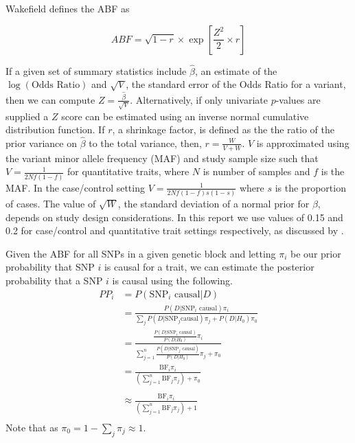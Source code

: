 \documentclass[a4paper,11pt]{report}
\begin{document}
Wakefield defines the ABF as

\begin{equation}
	ABF =  \sqrt{1 - r} \times \exp{\left[\frac{Z^{2}}{2} \times r\right]}
\end{equation}

If a given set of summary statistics include $\hat{\beta}$, an  estimate of the $\log(\text{Odds Ratio})$ and $\sqrt{V}$, the standard error of the Odds Ratio for a variant, then we can compute  $Z= \frac{\hat{\beta}}{\sqrt{V}}$. Alternatively, if only univariate $p$-values are supplied a $Z$ score can be estimated using an inverse normal cumulative distribution function. If $r$, a shrinkage factor, is defined as the  the ratio of the prior variance on $\hat{\beta}$ to the total variance, then, $r = \frac{W}{V + W}$. $V$ is approximated using the variant minor allele frequency (MAF) and study sample size such that $V=\frac{1}{2Nf(1-f)}$ for quantitative traits, where $N$ is number of samples and $f$ is the MAF. In the case/control setting $V=\frac{1}{2Nf(1-f)s(1-s)}$ where $s$ is the proportion of cases. The value of $\sqrt{W}$, the standard deviation of a normal prior for $\beta$, depends on study design considerations. In this report we use values of 0.15 and 0.2 for  case/control  and quantitative trait settings  respectively, as discussed by \citet{GiambartolomeiVukcevicSchadtEtAl2014}.

Given the ABF for all SNPs in a given genetic block and letting $\pi_{i}$ be our prior probability that SNP $i$ is  causal for a trait, we can estimate the posterior probability that a SNP $i$  is causal using the following. 
\begin{equation}
\label{form:bf_derivation}
\begin{split}
	PP_{i}& = P(\text{SNP}_{i}\text{ causal} | D)\\
	& = \frac{P(D | \text{SNP}_{i} \text{ causal})\pi_{i}}{\sum_{j}P(D | \text{SNP}_{j}\text{causal})\pi_{j} + P(D | H_{0})\pi_0}\\
	& = \frac{
				\frac{
					P(D | \text{SNP}_{i}\text{ causal})
				}
				{
					P(D|H_{0})
				}\pi_{i}
		}
		{
				\sum_{j=1}^n\frac{
					P(D | \text{SNP}_{j}\text{ causal})
				}
				{
					P(D|H_{0})
				}\pi_{j}  + \pi_0
		}	\\
	& = \frac{
		\text{BF}_{i}\pi_{i}
	}
	{
	(\sum_{j=1}^n\text{BF}_{j}\pi_{j}) + \pi_{0}
	} \\	
	\\
	& \approx \frac{
		\text{BF}_{i}\pi_{i}
	}
	{
	(\sum_{j=1}^n\text{BF}_{j}\pi_{j}) + 1
	} \\
\end{split}
\end{equation}
Note that as $\pi_{0} = 1-\sum_{j}\pi_{j} \approx 1$. 
\end{document}
